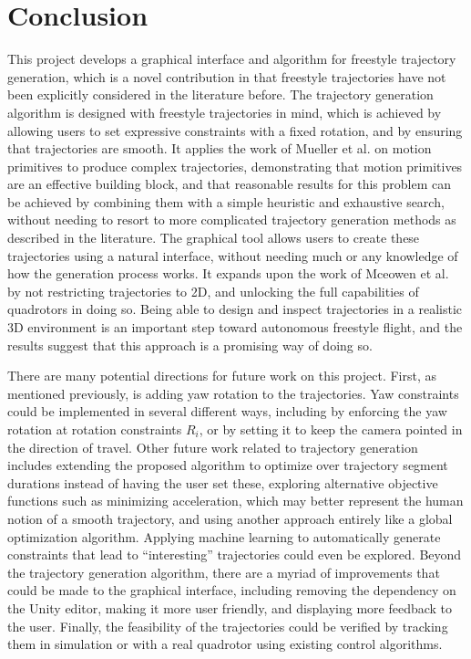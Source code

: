 \documentclass[pageno]{jpaper}
\newcommand{\quotes}[1]{``#1''}
\begin{document}
\section{Conclusion}

This project develops a graphical interface and algorithm for freestyle trajectory generation, which is a novel contribution in that freestyle trajectories have not been explicitly considered in the literature before. The trajectory generation algorithm is designed with freestyle trajectories in mind, which is achieved by allowing users to set expressive constraints with a fixed rotation, and by ensuring that trajectories are smooth. It applies the work of Mueller et al. on motion primitives to produce complex trajectories, demonstrating that motion primitives are an effective building block, and that reasonable results for this problem can be achieved by combining them with a simple heuristic and exhaustive search, without needing to resort to more complicated trajectory generation methods as described in the literature. The graphical tool allows users to create these trajectories using a natural interface, without needing much or any knowledge of how the generation process works. It expands upon the work of Mceowen et al. by not restricting trajectories to 2D, and unlocking the full capabilities of quadrotors in doing so. Being able to design and inspect trajectories in a realistic 3D environment is an important step toward autonomous freestyle flight, and the results suggest that this approach is a promising way of doing so.

There are many potential directions for future work on this project. First, as mentioned previously, is adding yaw rotation to the trajectories. Yaw constraints could be implemented in several different ways, including by enforcing the yaw rotation at rotation constraints $R_i$, or by setting it to keep the camera pointed in the direction of travel. Other future work related to trajectory generation includes extending the proposed algorithm to optimize over trajectory segment durations instead of having the user set these, exploring alternative objective functions such as minimizing acceleration, which may better represent the human notion of a smooth trajectory, and using another approach entirely like a global optimization algorithm. Applying machine learning to automatically generate constraints that lead to \quotes{interesting} trajectories could even be explored. Beyond the trajectory generation algorithm, there are a myriad of improvements that could be made to the graphical interface, including removing the dependency on the Unity editor, making it more user friendly, and displaying more feedback to the user. Finally, the feasibility of the trajectories could be verified by tracking them in simulation or with a real quadrotor using existing control algorithms.
\end{document}
